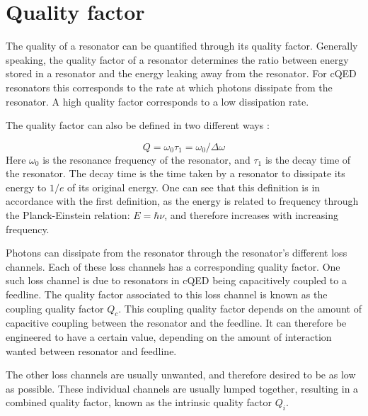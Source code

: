 \section{Quality factor}
\label{sec:Quality factor}
The quality of a resonator can be quantified through its quality factor. Generally speaking, the quality factor of a resonator determines the ratio between energy stored in a resonator and the energy leaking away from the resonator. For cQED resonators this corresponds to the rate at which photons dissipate from the resonator. A high quality factor corresponds to a low dissipation rate.

The quality factor can also be defined in two different ways \cite[p.~23-24]{Mazin}:

\begin{equation}
    Q = \omega_0 \tau_1 = \omega_0 / \Delta \omega
    \label{eqn:quality factor definition}
\end{equation}
Here $\omega_0$ is the resonance frequency of the resonator, and $\tau_1$ is the decay time of the resonator. The decay time is the time taken by a resonator to dissipate its energy to $1/e$ of its original energy. One can see that this definition is in accordance with the first definition, as the energy is related to frequency through the Planck-Einstein relation: $E = \hbar \nu$, and therefore increases with increasing frequency.


Photons can dissipate from the resonator through the resonator's different loss channels. Each of these loss channels has a corresponding quality factor. One such loss channel is due to resonators in cQED being capacitively coupled to a feedline. The quality factor associated to this loss channel is known as the coupling quality factor $Q_c$. This coupling quality factor depends on the amount of capacitive coupling between the resonator and the feedline. It can therefore be engineered to have a certain value, depending on the amount of interaction wanted between resonator and feedline.

The other loss channels are usually unwanted, and therefore desired to be as low as possible. These individual channels are usually lumped together, resulting in a combined quality factor, known as the intrinsic quality factor $Q_i$.

